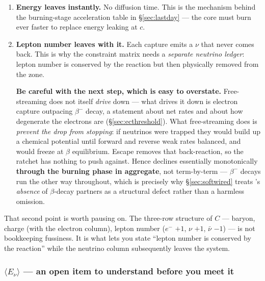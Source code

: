 \begin{enumerate}
\item \textbf{Energy leaves instantly.} No diffusion time. This is the
      mechanism behind the burning-stage acceleration table in
      \S\ref{sec:lastday} --- the core must burn ever faster to replace energy
      leaking at $c$.
\item \textbf{Lepton number leaves with it.} Each capture emits a $\nu$ that
      never comes back. This is why the constraint matrix needs a
      \emph{separate neutrino ledger}: lepton number is conserved by the
      reaction but then physically removed from the zone.

      \begin{warn}
      \textbf{Be careful with the next step, which is easy to overstate.}
      Free-streaming does not itself \emph{drive} \Ye{} down --- what drives it
      down is electron capture outpacing $\beta^-$ decay, a statement about net
      rates and about how degenerate the electrons are
      (\S\ref{sec:ecthreshold}). What free-streaming does is \emph{prevent the
      drop from stopping}: if neutrinos were trapped they would build up a
      chemical potential until forward and reverse weak rates balanced, and
      \Ye{} would freeze at $\beta$ equilibrium. Escape removes that
      back-reaction, so the ratchet has nothing to push against. Hence \Ye{}
      declines essentially monotonically \textbf{through the burning phase in
      aggregate}, not term-by-term --- $\beta^-$ decays run the other way
      throughout, which is precisely why \S\ref{sec:softwired} treats
      's \emph{absence} of $\beta$-decay partners as a structural
      defect rather than a harmless omission.
      \end{warn}
\end{enumerate}

That second point is worth pausing on. The three-row structure of $C$ ---
baryon, charge (with the electron column), lepton number ($e^-$ $+1$, $\nu$
$+1$, $\bar\nu$ $-1$) --- is not bookkeeping fussiness. It is what lets you
state ``lepton number is conserved by the reaction'' while the neutrino column
subsequently leaves the system.

\subsubsection{\texorpdfstring{$\langle E_\nu\rangle$}{<E nu>} --- an open item to
  understand before you meet it}
\label{sec:enu}

